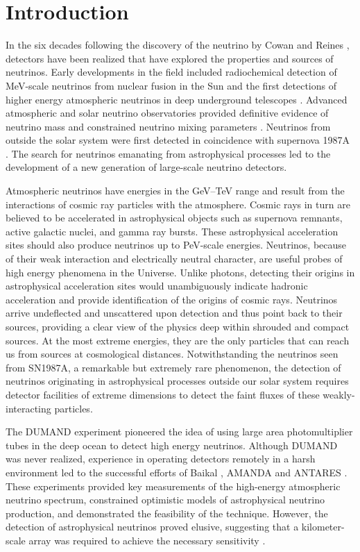 \section{Introduction}
\label{sec:intro}

In the six decades following the 
discovery of the neutrino by Cowan and Reines \cite{reines1960detection}, detectors have been realized
that have explored the properties and sources of neutrinos. Early developments in the field included 
radiochemical detection of MeV-scale neutrinos from
nuclear fusion in the Sun \cite{Homestake} and the first detections of
higher energy
atmospheric neutrinos in deep underground telescopes
\cite{Achar,Witwatersrand}. Advanced
atmospheric and solar neutrino observatories provided definitive
evidence of neutrino mass and constrained neutrino mixing
parameters \cite{SK,SNO}.  Neutrinos from outside the solar system
were first detected in coincidence with supernova 1987A
\cite{SK1987A,IMB1987A,BUST1987A}. The search for neutrinos emanating from astrophysical
processes led to the development of a new generation of large-scale neutrino detectors. 

Atmospheric neutrinos have energies in the GeV--TeV range and result from the interactions of cosmic ray
particles with the atmosphere. Cosmic rays in turn are
believed to be accelerated in astrophysical objects such as supernova
remnants, active galactic nuclei, and gamma ray bursts. These
astrophysical acceleration sites should also produce neutrinos up to 
PeV-scale energies. Neutrinos, because of their weak interaction and electrically neutral character, are useful probes of high
energy phenomena in the Universe. Unlike photons, detecting their origins in astrophysical
acceleration sites would unambiguously indicate hadronic acceleration and
provide identification of the origins of cosmic rays. Neutrinos arrive 
undeflected and unscattered upon detection and thus point back to their
sources, providing
a clear view of the physics deep within shrouded and compact sources. At
the most extreme energies, they are the only particles that can reach 
us from sources at cosmological distances. Notwithstanding the neutrinos seen from SN1987A, a remarkable but
extremely rare phenomenon, the detection of neutrinos originating in
astrophysical processes outside our solar system requires detector facilities of
extreme dimensions to detect the faint fluxes of these weakly-interacting
particles. 

The DUMAND experiment \cite{DUMAND} pioneered the idea of using large
area photomultiplier tubes in the deep ocean to detect high energy
neutrinos. Although DUMAND was never realized, experience in operating
detectors remotely in a harsh environment led to the successful
efforts of Baikal \cite{Baikal}, AMANDA \cite{AMANDA:detector} and
ANTARES \cite{ANTARES}. These experiments provided key measurements of the
high-energy atmospheric neutrino spectrum, constrained optimistic models of
astrophysical neutrino production, and demonstrated the feasibility of the
technique. However, the detection of astrophysical neutrinos proved
elusive, suggesting that a kilometer-scale array was required to
achieve the necessary sensitivity \cite{Halzen:2002pg,Learned:2000sw,Gaisser:1994yf}.  

